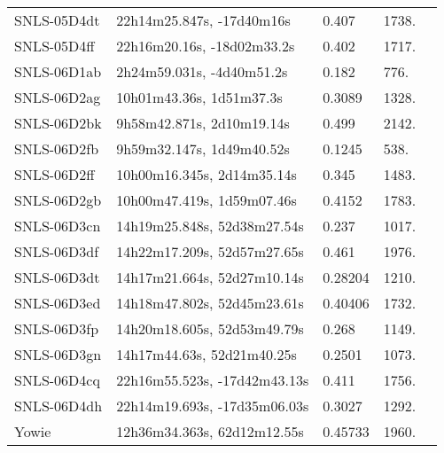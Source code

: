 \begin{longtable}{lllll}
      SNLS-05D4dt &      22h14m25.847s, -17d40m16s &    0.407 &          1738. &  \citet{2008AandA...477..717B} \\
      SNLS-05D4ff &     22h16m20.16s, -18d02m33.2s &    0.402 &          1717. &  \citet{2009AandA...507...85B} \\
      SNLS-06D1ab &      2h24m59.031s, -4d40m51.2s &    0.182 &           776. &  \citet{2009AandA...507...85B} \\
      SNLS-06D2ag &       10h01m43.36s, 1d51m37.3s &   0.3089 &          1328. &    \citet{2007ApJS..172...70L} \\
      SNLS-06D2bk &      9h58m42.871s, 2d10m19.14s &    0.499 &          2142. &  \citet{2009AandA...507...85B} \\
      SNLS-06D2fb &      9h59m32.147s, 1d49m40.52s &   0.1245 &           538. &    \citet{2007ApJS..172...70L} \\
      SNLS-06D2ff &     10h00m16.345s, 2d14m35.14s &    0.345 &          1483. &    \citet{2007ApJS..172...70L} \\
      SNLS-06D2gb &     10h00m47.419s, 1d59m07.46s &   0.4152 &          1783. &    \citet{2008ApJS..176...19F} \\
      SNLS-06D3cn &    14h19m25.848s, 52d38m27.54s &    0.237 &          1017. &    \citet{2005ApJS..158..161H} \\
      SNLS-06D3df &    14h22m17.209s, 52d57m27.65s &    0.461 &          1976. &    \citet{2005ApJS..158..161H} \\
      SNLS-06D3dt &    14h17m21.664s, 52d27m10.14s &  0.28204 &          1210. &    \citet{2007DEEP2.3...0000:} \\
      SNLS-06D3ed &    14h18m47.802s, 52d45m23.61s &  0.40406 &          1732. &    \citet{2007DEEP2.3...0000:} \\
      SNLS-06D3fp &    14h20m18.605s, 52d53m49.79s &    0.268 &          1149. &    \citet{2011MNRAS.410.1262W} \\
      SNLS-06D3gn &     14h17m44.63s, 52d21m40.25s &   0.2501 &          1073. &    \citet{2011MNRAS.410.1262W} \\
      SNLS-06D4cq &   22h16m55.523s, -17d42m43.13s &    0.411 &          1756. &  \citet{2009AandA...507...85B} \\
      SNLS-06D4dh &   22h14m19.693s, -17d35m06.03s &   0.3027 &          1292. &    \citet{2011MNRAS.410.1262W} \\
            Yowie &    12h36m34.363s, 62d12m12.55s &  0.45733 &          1960. &    \citet{2004AJ....127.3121W} \\
\end{longtable}
